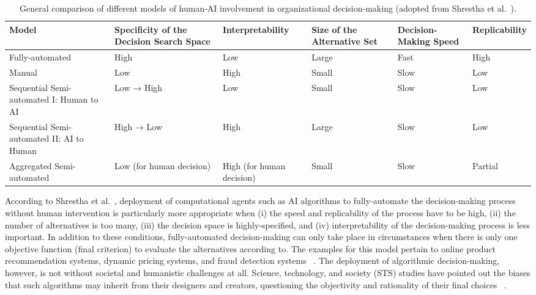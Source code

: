 \documentclass{sfuthesis}
\begin{document}
\begin{landscape}
\begin{table}
\centering
\small
\caption{General comparison of different models of human-AI involvement in organizational decision-making (adopted from Shrestha et al.~\cite{shrestha_organizational_2019}).}
\label{AIforDecision}
\begin{tabular}{p{5cm} p{4cm} p{4cm} p{3cm} p{3cm} p{2cm}}
\hline
Model & Specificity of the Decision Search Space & Interpretability & Size of the Alternative Set & Decision-Making Speed & Replicability \\
\hline
Fully-automated  & High   & Low  & Large & Fast  & High  \\
Manual & Low & High & Small & Slow & Low  \\
Sequential Semi-automated I: Human to AI  & Low → High & Low & Small & Slow & Low \\
Sequential Semi-automated II: AI to Human & High → Low & High & Large & Slow & Low \\
Aggregated Semi-automated & Low (for human decision) & High (for human decision) & Small & Slow & Partial \\
\hline
\end{tabular}
\end{table}
\clearpage
\end{landscape}
According to Shrestha et al.~\cite{shrestha_organizational_2019}, deployment of computational agents such as AI algorithms to fully-automate the decision-making process without human intervention is particularly more appropriate when (i) the speed and replicability of the process have to be high, (ii) the number of alternatives is too many, (iii) the decision space is highly-specified, and (iv) interpretability of the decision-making process is less important. In addition to these conditions, fully-automated decision-making can only take place in circumstances when there is only one objective function (final criterion) to evaluate the alternatives according to. The examples for this model pertain to online product recommendation systems, dynamic pricing systems, and fraud detection systems ~\cite{shrestha_organizational_2019}. The deployment of algorithmic decision-making, however, is not without societal and humanistic challenges at all. Science, technology, and society (STS) studies have pointed out the biases that such algorithms may inherit from their designers and creators, questioning the objectivity and rationality of their final choices ~\cite{barocas2016big}.\par
\end{document}
